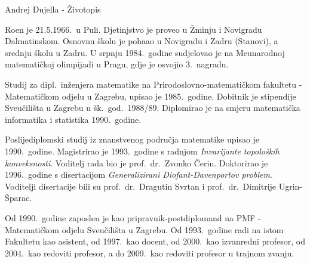 \documentclass[11pt]{report}
\begin{document}
\begin{center}
{\Large Andrej Dujella - \v{Z}ivotopis} \vspace{3mm}
\end{center}

Ro{\dj}en je 21.5.1966.~u Puli. Djetinjstvo je proveo u \v{Z}minju i
Novigradu Dalmatinskom. Osnovnu \v{s}kolu je poha{\dj}ao u Novigradu
i Zadru (Stanovi), a srednju \v{s}kolu u Zadru. U srpnju
1984.~godine sudjelovao je na Me{\dj}unarodnoj matemati\v{c}koj
olimpijadi u Pragu, gdje je osvojio 3.~nagradu.

Studij za dipl.~in\v{z}enjera matematike na
Prirodoslovno-matemati\v{c}kom fakultetu - Mate\-ma\-ti\v{c}kom
odjelu u Zagrebu, upisao je 1985.~godine. Dobitnik je stipendije
Sveu\v{c}ili\v{s}ta u Zagrebu u \v{s}k.~god.~1988/89. Diplomirao je
na smjeru matemati\v{c}ka informatika i statistika 1990.~godine.

Poslijediplomski studij iz znanstvenog podru\v{c}ja matematike upisao
je 1990.~godine. Magistrirao je 1993.~godine s radnjom {\it
Invarijante topolo\v{s}kih konveksnosti}. Voditelj rada bio je
prof.~dr.~Zvonko \v{C}erin. Doktorirao je 1996.~godine s disertacijom
{\it Generalizirani Diofant-Davenportov problem}. Voditelji
disertacije bili su prof.~dr.~Dragutin Svrtan i
prof.~dr.~Dimitrije Ugrin-\v{S}parac.

Od 1990.~godine zaposlen je kao pripravnik-postdiplomand na PMF -
Matemati\v{c}kom odjelu Sveu\v{c}ili\v{s}ta u Zagrebu. Od 1993.~godine radi
na istom Fakultetu kao asistent, od 1997.~kao docent, od 2000.~kao
izvanredni profesor, od 2004.~kao redoviti profesor, a do 2009.~kao
redoviti profesor u trajnom zvanju.

\medskip
\end{document}
